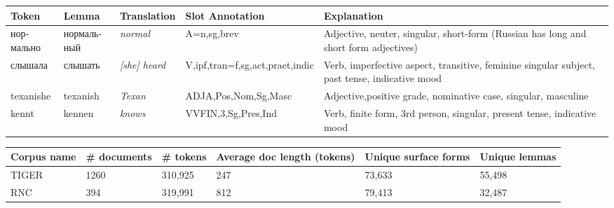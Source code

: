 \documentclass[11pt,a4paper]{article}
\begin{document}


\begin{table*}[t]
    \label{table:sampleannotations}
    \centering
    \begin{tabularx}{6.8in}{|l|l|l|l|X|} \hline
       \textbf{Token} & \textbf{Lemma} & \textbf{Translation} & \textbf{Slot Annotation} & \textbf{Explanation} \\ \hline
       \foreignlanguage{russian}{нормально} & \foreignlanguage{russian}{нормальный} & \textit{normal} & A=n,sg,brev & Adjective, neuter, singular, short-form (Russian has long and short form adjectives) \\ \hline
       \foreignlanguage{russian}{слышала} & \foreignlanguage{russian}{слышать} & \textit{[she]  heard} &
       V,ipf,tran=f,sg,act,praet,indic & Verb, imperfective aspect, transitive, feminine singular subject, past tense, indicative mood \\ \hline
       texanishe & texanish & \textit{Texan} & ADJA,Pos,Nom,Sg,Masc & Adjective,positive grade, nominative case, singular, masculine \\ \hline
       kennt & kennen & \textit{knows} & VVFIN,3,Sg,Pres,Ind & Verb, finite form, 3rd person, singular, present tense, indicative mood \\ \hline
    \end{tabularx}
\end{table*}


\begin{table*}[t]
    \label{table:corpusstats}
    \begin{tabularx}{6.8in}{|l|l|l|X|l|l|} \hline
        \textbf{Corpus name} & \textbf{\# documents} & \textbf{\# tokens} & \textbf{Average doc length (tokens)} & \textbf{Unique surface forms} & \textbf{Unique lemmas} \\ \hline
        TIGER & 1260 & 310,925 & 247 & 73,633 & 55,498 \\ \hline
        RNC & 394 & 319,991 & 812 & 79,413 & 32,487 \\ \hline
    \end{tabularx}
\end{table*}
\end{document}
